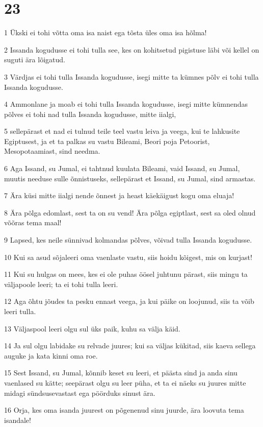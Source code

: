 \chapter{23}

\par 1 Ükski ei tohi võtta oma isa naist ega tõsta üles oma isa hõlma!
\par 2 Issanda kogudusse ei tohi tulla see, kes on kohitsetud pigistuse läbi või kellel on suguti ära lõigatud.
\par 3 Värdjas ei tohi tulla Issanda kogudusse, isegi mitte ta kümnes põlv ei tohi tulla Issanda kogudusse.
\par 4 Ammonlane ja moab ei tohi tulla Issanda kogudusse, isegi mitte kümnendas põlves ei tohi nad tulla Issanda kogudusse, mitte iialgi,
\par 5 sellepärast et nad ei tulnud teile teel vastu leiva ja veega, kui te lahkusite Egiptusest, ja et ta palkas su vastu Bileami, Beori poja Petoorist, Mesopotaamiast, sind needma.
\par 6 Aga Issand, su Jumal, ei tahtnud kuulata Bileami, vaid Issand, su Jumal, muutis needuse sulle õnnistuseks, sellepärast et Issand, su Jumal, sind armastas.
\par 7 Ära küsi mitte iialgi nende õnnest ja heast käekäigust kogu oma eluaja!
\par 8 Ära põlga edomlast, sest ta on su vend! Ära põlga egiptlast, sest sa oled olnud võõras tema maal!
\par 9 Lapsed, kes neile sünnivad kolmandas põlves, võivad tulla Issanda kogudusse.
\par 10 Kui sa asud sõjaleeri oma vaenlaste vastu, siis hoidu kõigest, mis on kurjast!
\par 11 Kui su hulgas on mees, kes ei ole puhas öösel juhtunu pärast, siis mingu ta väljapoole leeri; ta ei tohi tulla leeri.
\par 12 Aga õhtu jõudes ta pesku ennast veega, ja kui päike on loojunud, siis ta võib leeri tulla.
\par 13 Väljaspool leeri olgu sul üks paik, kuhu sa välja käid.
\par 14 Ja sul olgu labidake su relvade juures; kui sa väljas kükitad, siis kaeva sellega auguke ja kata kinni oma roe.
\par 15 Sest Issand, su Jumal, kõnnib keset su leeri, et päästa sind ja anda sinu vaenlased su kätte; seepärast olgu su leer püha, et ta ei näeks su juures mitte midagi sündsusevastast ega pöörduks sinust ära.
\par 16 Orja, kes oma isanda juurest on põgenenud sinu juurde, ära loovuta tema isandale!
